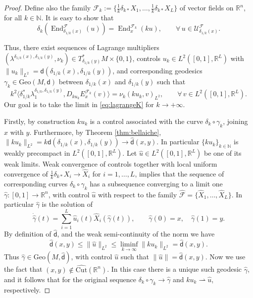 \documentclass[11pt,a4paper]{article}
\theoremstyle{plain}
\theoremstyle{definition}
\theoremstyle{remark}
\numberwithin{equation}{section}
\newcommand{\R}{\mathbb{R}} %
\newcommand{\N}{\mathbb{N}} %
\newcommand{\Cut}{\mathrm{Cut}}
\DeclareMathOperator{\End}{\mathrm{End}}
\newcommand{\Geo}{\mathrm{Geo}}
\newcommand{\sfd}{\mathsf d}
\begin{document}
\begin{proof}
Define also the family $\mathscr{F}_k := \{\tfrac{1}{k} \delta_{k*} X_1,\dots,\tfrac{1}{k} \delta_{k*} X_L\}$ of vector fields on $\R^n$, for all $k\in \N$. It is easy to show that
\begin{equation}
\delta_k (\End_{\delta_{1/k}(x)}^{\mathscr{F}}(u)) = \End_x^{\mathscr{F}_k}(k u), \qquad \forall\, u \in \mathcal{U}_{\delta_{1/k}(x)}^{\mathscr{F}}.
\end{equation}

Thus, there exist sequences of Lagrange multipliers $(\lambda^{\delta_{1/k}(x),\delta_{1/k}(y)},\nu_k)\in T_{\delta_{1/k}(y)}^*M\times \{0,1\}$, controls $u_k \in L^2([0,1],\R^L)$ with $\|u_k\|_{L^2} = \sfd(\delta_{1/k}(x),\delta_{1/k}(y))$, and corresponding geodesics $\gamma_k \in \Geo(M,\sfd)$ between $\delta_{1/k}(x)$ and $\delta_{1/k}(y)$ such that
\begin{equation}\label{eq:lagrangeK}
 k^2 \langle\delta_{1/k}^* \lambda^{\delta_{1/k},\delta_{1/k}(y)}_1, D_{ku_k} E_x^{\mathscr{F}_k}(v)\rangle  = \nu_k (k u_k,v)_{L^2},\qquad \forall\, v\in L^2([0,1],\R^L).
\end{equation}
Our goal is to take the limit in \eqref{eq:lagrangeK} for $k\to +\infty$.

Firstly, by construction $k u_k$ is a control associated with the curve $\delta_k\circ \gamma_k$, joining $x$ with $y$. Furthermore, by Theorem \ref{thm:bellaiche}, $\|k u_k\|_{L^2} = k\sfd(\delta_{1/k}(x),\delta_{1/k}(y))\to \hat{\sfd}(x,y)$. In particular $\{ku_k\}_{k\in \N}$ is weakly precompact in $L^2([0,1],\R^L)$. Let $\hat{u}\in L^2([0,1],\R^L)$ be one of its weak limits. Weak convergence of controls together with local uniform convergence of $\tfrac{1}{k}\delta_{k*}X_i\to \hat{X}_i$ for $i=1,\dots,L$, implies that the sequence of corresponding curves $\delta_k\circ \gamma_k$ has a subsequence converging to a limit one $\hat{\gamma}:[0,1]\to \R^n$, with control $\hat{u}$ with respect to the family $\hat{\mathscr{F}} = \{\hat{X}_1,\dots,\hat{X}_L\}$. In particular $\hat{\gamma}$ is the solution of
\begin{equation}
\dot{\hat{\gamma}}(t) = \sum_{i=1}^L \hat{u}_i(t)\hat{X}_i(\hat{\gamma}(t)), \qquad \hat{\gamma}(0) =x,\quad \hat{\gamma}(1) = y.
\end{equation}
By definition of $\hat{\sfd}$, and the weak semi-continuity of the norm we have
\begin{equation}
\hat{\sfd}(x,y)\leq \|\hat{u}\|_{L^2} \leq \liminf_{k\to \infty} \|k u_k\|_{L^2} = \hat{\sfd}(x,y).
\end{equation}
Thus $\hat{\gamma} \in \Geo(M,\hat{\sfd})$, with control $\hat{u}$ such that $\|\hat{u}\| = \hat{\sfd}(x,y)$. Now we use the fact that $(x,y)\notin \widehat{\Cut}(\R^n)$. In this case there is a unique such  geodesic $\hat\gamma$, and it follows that for the original sequence $\delta_k\circ\gamma_k \to \hat{\gamma}$ and $ku_k\rightharpoonup \hat{u}$, respectively. 



\end{proof}
\end{document}
